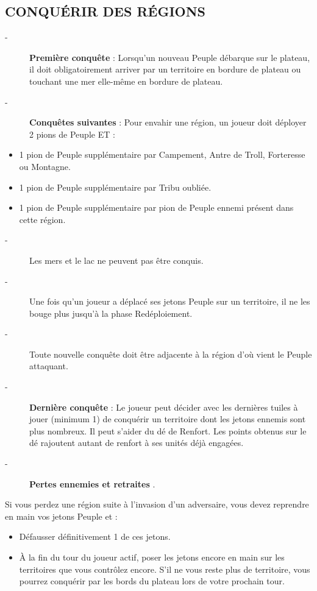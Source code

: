\documentclass{scrartcl}%
\begin{document}
%
\subsection{ CONQUÉRIR DES RÉGIONS
}%
\label{subsec:CONQURIRDESRGIONS}%
\begin{description}%
\item[{-} ]%
%
\textcolor{mygreen}{%
\textbf{Première conquête}%
}%
\textit{ }%
 : Lorsqu'un nouveau Peuple débarque sur le plateau, il doit obligatoirement arriver par un territoire en bordure de plateau ou touchant une mer elle{-}même en bordure de plateau.
%
\item[{-} ]%
%
\textcolor{mygreen}{%
\textbf{Conquêtes suivantes}%
}%
\textit{ }%
 : Pour envahir une région, un joueur doit déployer 2 pions de Peuple ET :
%
\end{description}%
\begin{itemize}%
\item%
%
 1 pion de Peuple supplémentaire par Campement, Antre de Troll, Forteresse ou Montagne.
%
\item%
%
 1 pion de Peuple supplémentaire par Tribu oubliée.
%
\item%
%
 1 pion de Peuple supplémentaire par pion de Peuple ennemi présent dans cette région.
%
\end{itemize}%
\begin{description}%
\item[{-} ]%
%
 Les mers et le lac ne peuvent pas être conquis.
%
\item[{-} ]%
%
 Une fois qu'un joueur a déplacé ses jetons Peuple sur un territoire, il ne les bouge plus jusqu'à la phase Redéploiement.
%
\item[{-} ]%
%
 Toute nouvelle conquête doit être adjacente à la région d'où vient le Peuple attaquant.
%
\item[{-} ]%
%
\textcolor{mygreen}{%
\textbf{Dernière conquête}%
}%
: Le joueur peut décider avec les dernières tuiles à jouer (minimum 1) de conquérir un territoire dont les jetons ennemis sont plus nombreux. Il peut s'aider du dé de Renfort. Les points obtenus sur le dé rajoutent autant de renfort à ses unités déjà engagées.
%
\item[{-} ]%
%
\textcolor{mygreen}{%
\textbf{Pertes ennemies et retraites}%
}%
.
%
\end{description}%
Si vous perdez une région suite à l'invasion d'un adversaire, vous devez reprendre en main vos jetons Peuple et :
%
\begin{itemize}%
\item%
%
 Défausser définitivement 1 de ces jetons.
%
\item%
%
 À la fin du tour du joueur actif, poser les jetons encore en main sur les territoires que vous contrôlez encore. S'il ne vous reste plus de territoire, vous pourrez conquérir par les bords du plateau lors de votre prochain tour.
%
\end{itemize}%
\end{document}
